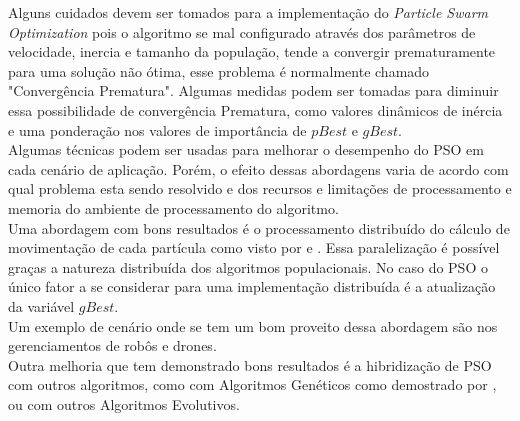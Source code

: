 \indent Alguns cuidados devem ser tomados para a implementação do \textit{Particle Swarm Optimization} pois o algoritmo se mal configurado através dos parâmetros de velocidade, inercia e tamanho da população, tende a convergir prematuramente para uma solução não ótima, esse problema é normalmente chamado "Convergência Prematura".
%
Algumas medidas podem ser tomadas para diminuir essa possibilidade de convergência Prematura, como valores dinâmicos de inércia e uma ponderação nos valores de importância de $pBest$ e $gBest$.\\
\indent Algumas técnicas podem ser usadas para melhorar o desempenho do PSO em cada cenário de aplicação. Porém, o efeito dessas abordagens varia de acordo com qual problema esta sendo resolvido e dos recursos e limitações de processamento e memoria do ambiente de processamento do algoritmo.\\
\indent Uma abordagem com bons resultados é o processamento distribuído do cálculo de movimentação de cada partícula como visto por \cite{Thongkrairat2019} e \cite{Kim2011}. Essa paralelização é possível graças a natureza distribuída dos algoritmos populacionais. No caso do PSO o único fator a se considerar para uma implementação distribuída é a atualização da variável $gBest$.\\
%
\indent Um exemplo de cenário onde se tem um bom proveito dessa abordagem são nos gerenciamentos de robôs e drones.\\  
\indent Outra melhoria que tem demonstrado bons resultados é a hibridização de PSO com outros algoritmos, como com Algoritmos Genéticos como demostrado por \cite{carvalho2014}, ou com outros Algoritmos Evolutivos.

